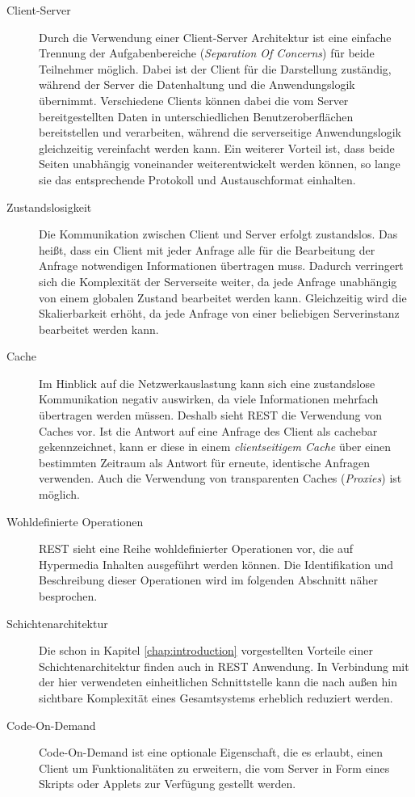 \begin{description}
  \item[Client-Server] Durch die Verwendung einer Client-Server Architektur ist
  eine einfache Trennung der Aufgabenbereiche (\emph{Separation Of Concerns}) für
  beide Teilnehmer möglich. Dabei ist der Client für die Darstellung zuständig,
  während der Server die Datenhaltung und die Anwendungslogik übernimmt.
  Verschiedene Clients können dabei die vom Server bereitgestellten Daten in
  unterschiedlichen Benutzeroberflächen bereitstellen und verarbeiten, während
  die serverseitige Anwendungslogik gleichzeitig vereinfacht werden kann. Ein
  weiterer Vorteil ist, dass beide Seiten unabhängig voneinander weiterentwickelt
  werden können, so lange sie das entsprechende Protokoll und Austauschformat
  einhalten.
  \item[Zustandslosigkeit] Die Kommunikation zwischen Client und Server erfolgt
  zustandslos. Das heißt, dass ein Client mit jeder Anfrage alle für die
  Bearbeitung der Anfrage notwendigen Informationen übertragen muss. Dadurch
  verringert sich die Komplexität der Serverseite weiter, da jede Anfrage
  unabhängig von einem globalen Zustand bearbeitet werden kann. Gleichzeitig
  wird die Skalierbarkeit erhöht, da jede Anfrage von einer beliebigen
  Serverinstanz bearbeitet werden kann.
  \item[Cache] Im Hinblick auf die Netzwerkauslastung kann sich eine zustandslose
  Kommunikation negativ auswirken, da viele Informationen mehrfach übertragen
  werden müssen. Deshalb sieht \ac{REST} die Verwendung von Caches vor. Ist die
  Antwort auf eine Anfrage des Client als cachebar gekennzeichnet, kann er diese
  in einem \emph{clientseitigem Cache} über einen bestimmten Zeitraum als Antwort
  für erneute, identische Anfragen verwenden. Auch die Verwendung von
  transparenten Caches (\emph{Proxies}) ist möglich.
  \item[Wohldefinierte Operationen] \ac{REST} sieht eine Reihe wohldefinierter
  Operationen vor, die auf Hypermedia Inhalten ausgeführt werden können. Die
  Identifikation und Beschreibung dieser Operationen wird im folgenden
  Abschnitt näher besprochen.
  \item[Schichtenarchitektur] Die schon in Kapitel \ref{chap:introduction}
  vorgestellten Vorteile einer Schichtenarchitektur finden auch in \ac{REST}
  Anwendung. In Verbindung mit der hier verwendeten einheitlichen Schnittstelle
  kann die nach außen hin sichtbare Komplexität eines Gesamtsystems erheblich
  reduziert werden.
  \item[Code-On-Demand] Code-On-Demand ist eine optionale Eigenschaft,
  die es erlaubt, einen Client um Funktionalitäten zu erweitern, die
  vom Server in Form eines Skripts oder Applets zur Verfügung gestellt werden. 
\end{description}


